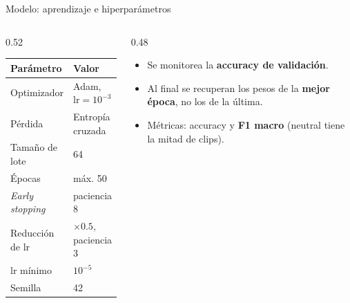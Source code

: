 \documentclass[aspectratio=169,11pt]{beamer}
\begin{document}
\begin{frame}{Modelo: aprendizaje e hiperparámetros}
  \begin{columns}[T]
    \begin{column}{0.52\textwidth}
      \centering
      \begin{tabular}{ll}
        \toprule
        Parámetro & Valor \\
        \midrule
        Optimizador & Adam, $\text{lr}=10^{-3}$ \\
        Pérdida & Entropía cruzada \\
        Tamaño de lote & 64 \\
        Épocas & máx. 50 \\
        \emph{Early stopping} & paciencia 8 \\
        Reducción de lr & $\times 0.5$, paciencia 3 \\
        lr mínimo & $10^{-5}$ \\
        Semilla & 42 \\
        \bottomrule
      \end{tabular}
    \end{column}
    \begin{column}{0.48\textwidth}
      \begin{itemize}
        \item Se monitorea la \textbf{accuracy de validación}.
        \item Al final se recuperan los pesos de la \textbf{mejor época}, no los de la última.
        \item Métricas: accuracy y \textbf{F1 macro} (neutral tiene la mitad de clips).
      \end{itemize}
    \end{column}
  \end{columns}
\end{frame}
\end{document}
